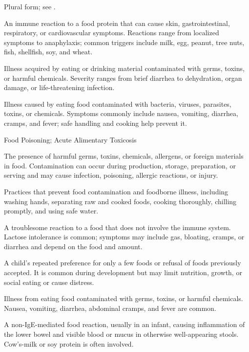  Plural form; see .

 An immune reaction to a food protein that can cause skin, gastrointestinal, respiratory, or cardiovascular symptoms. Reactions range from localized symptoms to anaphylaxis; common triggers include milk, egg, peanut, tree nuts, fish, shellfish, soy, and wheat.

 Illness acquired by eating or drinking material contaminated with germs, toxins, or harmful chemicals. Severity ranges from brief diarrhea to dehydration, organ damage, or life-threatening infection.

 Illness caused by eating food contaminated with bacteria, viruses, parasites, toxins, or chemicals. Symptoms commonly include nausea, vomiting, diarrhea, cramps, and fever; safe handling and cooking help prevent it.

\synonyms
Food Poisoning; Acute Alimentary Toxicosis

 The presence of harmful germs, toxins, chemicals, allergens, or foreign materials in food. Contamination can occur during production, storage, preparation, or serving and may cause infection, poisoning, allergic reactions, or injury.

 Practices that prevent food contamination and foodborne illness, including washing hands, separating raw and cooked foods, cooking thoroughly, chilling promptly, and using safe water.

 A troublesome reaction to a food that does not involve the immune system. Lactose intolerance is common; symptoms may include gas, bloating, cramps, or diarrhea and depend on the food and amount.

 A child’s repeated preference for only a few foods or refusal of foods previously accepted. It is common during development but may limit nutrition, growth, or social eating or cause distress.

 Illness from eating food contaminated with germs, toxins, or harmful chemicals. Nausea, vomiting, diarrhea, abdominal cramps, and fever are common.

 A non-IgE-mediated food reaction, usually in an infant, causing inflammation of the lower bowel and visible blood or mucus in otherwise well-appearing stools. Cow’s-milk or soy protein is often involved.

